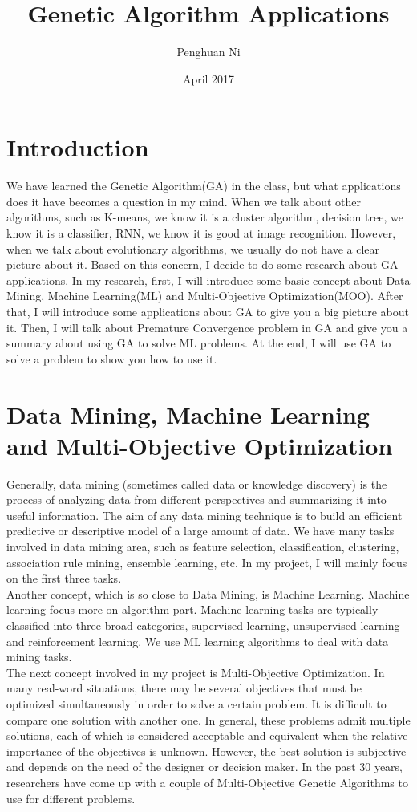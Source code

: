 \documentclass{article}
\title{Genetic Algorithm Applications}
\author{Penghuan Ni}
\date{April 2017}
\begin{document}
\maketitle

\section{Introduction}
We have learned the Genetic Algorithm(GA) in the class, but what applications does it have becomes a question in my mind. When we talk about other algorithms, such as K-means, we know it is a cluster algorithm, decision tree, we know it is a classifier, RNN, we know it is good at image recognition. However, when we talk about evolutionary algorithms, we usually do not have a clear picture about it. Based on this concern, I decide to do some research about GA applications. In my research, first, I will introduce some basic concept about Data Mining, Machine Learning(ML) and Multi-Objective Optimization(MOO). After that, I will introduce some applications about GA to give you a big picture about it. Then, I will talk about Premature Convergence problem in GA and give you a summary about using GA to solve ML problems. At the end, I will use GA to solve a problem to show you how to use it.

\section{Data Mining, Machine Learning and Multi-Objective Optimization}
Generally, data mining (sometimes called data or knowledge discovery) is the process of analyzing data from different perspectives and summarizing it into useful information. The aim of any data mining technique is to build an efficient predictive or descriptive model of a large amount of data. We have many tasks involved in data mining area, such as feature selection, classification, clustering, association rule mining, ensemble learning, etc. In my project, I will mainly focus on the first three tasks. \\

Another concept, which is so close to Data Mining, is Machine Learning. Machine learning focus more on algorithm part. Machine learning tasks are typically classified into three broad categories, supervised learning, unsupervised learning and reinforcement learning. We use ML learning algorithms to deal with data mining tasks. \\

The next concept involved in my project is Multi-Objective Optimization. In many real-word situations, there may be several objectives that must be optimized simultaneously in order to solve a certain problem. It is difficult to compare one solution with another one. In general, these problems admit multiple solutions, each of which is considered acceptable and equivalent when the relative importance of the objectives is unknown. However, the best solution is subjective and depends on the need of the designer or decision maker. In the past 30 years, researchers have come up with a couple of Multi-Objective Genetic Algorithms to use for different problems.
\end{document}

